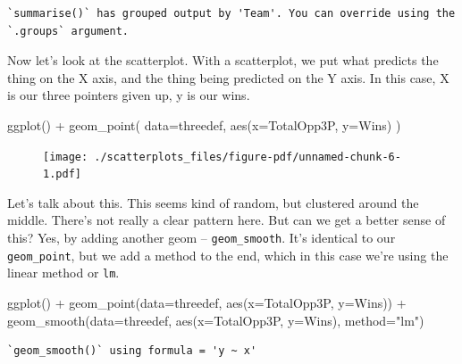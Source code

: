 \documentclass[
  letterpaper,
  DIV=11,
  numbers=noendperiod]{scrreprt}
\newenvironment{Shaded}{\begin{snugshade}}{\end{snugshade}}
\newcommand{\AttributeTok}[1]{\textcolor[rgb]{0.40,0.45,0.13}{#1}}
\newcommand{\FunctionTok}[1]{\textcolor[rgb]{0.28,0.35,0.67}{#1}}
\newcommand{\NormalTok}[1]{\textcolor[rgb]{0.00,0.23,0.31}{#1}}
\newcommand{\SpecialCharTok}[1]{\textcolor[rgb]{0.37,0.37,0.37}{#1}}
\newcommand{\StringTok}[1]{\textcolor[rgb]{0.13,0.47,0.30}{#1}}
\begin{document}
\begin{verbatim}
`summarise()` has grouped output by 'Team'. You can override using the
`.groups` argument.
\end{verbatim}

Now let's look at the scatterplot. With a scatterplot, we put what
predicts the thing on the X axis, and the thing being predicted on the Y
axis. In this case, X is our three pointers given up, y is our wins.

\begin{Shaded}
\begin{Highlighting}[]
\FunctionTok{ggplot}\NormalTok{() }\SpecialCharTok{+} 
  \FunctionTok{geom\_point}\NormalTok{(}
    \AttributeTok{data=}\NormalTok{threedef, }
    \FunctionTok{aes}\NormalTok{(}\AttributeTok{x=}\NormalTok{TotalOpp3P, }\AttributeTok{y=}\NormalTok{Wins)}
\NormalTok{    )}
\end{Highlighting}
\end{Shaded}

\begin{figure}[H]

{\centering \texttt{[image: ./scatterplots\_files/figure-pdf/unnamed-chunk-6-1.pdf]}

}

\end{figure}

Let's talk about this. This seems kind of random, but clustered around
the middle. There's not really a clear pattern here. But can we get a
better sense of this? Yes, by adding another geom --
\texttt{geom\_smooth}. It's identical to our \texttt{geom\_point}, but
we add a method to the end, which in this case we're using the linear
method or \texttt{lm}.

\begin{Shaded}
\begin{Highlighting}[]
\FunctionTok{ggplot}\NormalTok{() }\SpecialCharTok{+} 
  \FunctionTok{geom\_point}\NormalTok{(}\AttributeTok{data=}\NormalTok{threedef, }\FunctionTok{aes}\NormalTok{(}\AttributeTok{x=}\NormalTok{TotalOpp3P, }\AttributeTok{y=}\NormalTok{Wins)) }\SpecialCharTok{+}
  \FunctionTok{geom\_smooth}\NormalTok{(}\AttributeTok{data=}\NormalTok{threedef, }\FunctionTok{aes}\NormalTok{(}\AttributeTok{x=}\NormalTok{TotalOpp3P, }\AttributeTok{y=}\NormalTok{Wins), }\AttributeTok{method=}\StringTok{"lm"}\NormalTok{)}
\end{Highlighting}
\end{Shaded}

\begin{verbatim}
`geom_smooth()` using formula = 'y ~ x'
\end{verbatim}
\end{document}

